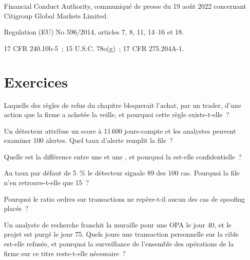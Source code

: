 \begin{omsources}
\item Financial Conduct Authority, communiqué de presse du 19 août 2022 concernant Citigroup Global Markets Limited.
\item Regulation (EU) No 596/2014, articles 7, 8, 11, 14--16 et 18.
\item 17 CFR 240.10b-5~; 15 U.S.C. 78o(g)~; 17 CFR 275.204A-1.
\end{omsources}

\section{Exercices}

\begin{exercise}[$\star$]\label{exo:fm:compliance-and-market-abuse:1}
Laquelle des règles de refus du chapitre bloquerait l'achat, par un trader, d'une action que la firme a achetée la veille, et pourquoi cette règle existe-t-elle~?
\end{exercise}

\begin{exercise}[$\star$]\label{exo:fm:compliance-and-market-abuse:2}
Un détecteur attribue un score à 11\,600 jours-compte et les analystes peuvent examiner 100 alertes. Quel taux d'alerte remplit la file~?
\end{exercise}

\begin{exercise}[$\star$]\label{exo:fm:compliance-and-market-abuse:3}
Quelle est la différence entre une  et une , et pourquoi la  est-elle confidentielle~?
\end{exercise}

\begin{exercise}[$\star\star$]\label{exo:fm:compliance-and-market-abuse:4}
Au taux par défaut de 5~\% le détecteur signale 89 des 100 cas. Pourquoi la file n'en retrouve-t-elle que 15~?
\end{exercise}

\begin{exercise}[$\star\star$]\label{exo:fm:compliance-and-market-abuse:5}
Pourquoi le ratio ordres sur transactions ne repère-t-il aucun des cas de spoofing placés~?
\end{exercise}

\begin{exercise}[$\star\star$]\label{exo:fm:compliance-and-market-abuse:6}
Un analyste de recherche franchit la muraille pour une OPA le jour 40, et le projet est purgé le jour 75. Quels jours une transaction personnelle sur la cible
est-elle refusée, et pourquoi la surveillance de l'ensemble des opérations de la firme sur ce titre reste-t-elle nécessaire~?
\end{exercise}

